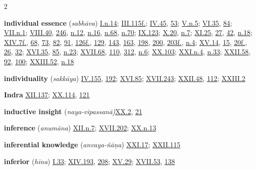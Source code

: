 \begin{multicols}{2}
\begin{vismHanging}
\par\textbf{individual essence} (\emph{sabhāva}) \hyperlink{I.n14}{I.n.14}{}; \hyperlink{III.115}{III.115f.}{}; \hyperlink{IV.45}{IV.45}{}, \hyperlink{IV.53}{53}{}; \hyperlink{V.n5}{V.n.5}{}; \hyperlink{VI.35}{VI.35}{}, \hyperlink{VI.84}{84}{}; \hyperlink{VII.n1}{VII.n.1}{}; \hyperlink{VIII.40}{VIII.40}{}, \hyperlink{VIII.246}{246}{}, \hyperlink{VIII.n12}{n.12}{}, \hyperlink{VIII.n16}{n.16}{}, \hyperlink{VIII.n68}{n.68}{}, \hyperlink{VIII.n70}{n.70}{}; \hyperlink{IX.123}{IX.123}{}; \hyperlink{X.20}{X.20}{}, \hyperlink{X.n7}{n.7}{}; \hyperlink{XI.25}{XI.25}{}, \hyperlink{XI.27}{27}{}, \hyperlink{XI.42}{42}{}, \hyperlink{XI.n18}{n.18}{}; \hyperlink{XIV.7}{XIV.7f.}{}, \hyperlink{XIV.68}{68}{}, \hyperlink{XIV.73}{73}{}, \hyperlink{XIV.82}{82}{}, \hyperlink{XIV.91}{91}{}, \hyperlink{XIV.126}{126f.}{}, \hyperlink{XIV.129}{129}{}, \hyperlink{XIV.143}{143}{}, \hyperlink{XIV.163}{163}{}, \hyperlink{XIV.198}{198}{}, \hyperlink{XIV.200}{200}{}, \hyperlink{XIV.203}{203f.}{}, \hyperlink{XIV.n4}{n.4}{}; \hyperlink{XV.14}{XV.14}{}, \hyperlink{XV.15}{15}{}, \hyperlink{XV.20}{20f.}{}, \hyperlink{XV.26}{26}{}, \hyperlink{XV.32}{32}{}; \hyperlink{XVI.35}{XVI.35}{}, \hyperlink{XVI.85}{85}{}, \hyperlink{XVI.n23}{n.23}{}; \hyperlink{XVII.68}{XVII.68}{}, \hyperlink{XVII.110}{110}{}, \hyperlink{XVII.312}{312}{}, \hyperlink{XVII.n6}{n.6}{}; \hyperlink{XX.103}{XX.103}{}; \hyperlink{XXI.n4}{XXI.n.4}{}, \hyperlink{XXI.n33}{n.33}{}; \hyperlink{XXII.58}{XXII.58}{}, \hyperlink{XXII.92}{92}{}, \hyperlink{XXII.100}{100}{}; \hyperlink{XXIII.52}{XXIII.52}{}, \hyperlink{XXIII.n18}{n.18}{}
\par\textbf{individuality} (\emph{sakkāya}) \hyperlink{IV.155}{IV.155}{}, \hyperlink{IV.192}{192}{}; \hyperlink{XVI.85}{XVI.85}{}; \hyperlink{XVII.243}{XVII.243}{}; \hyperlink{XXII.48}{XXII.48}{}, \hyperlink{XXII.112}{112}{}; \hyperlink{XXIII.2}{XXIII.2}{}
\par\textbf{Indra} \hyperlink{XII.137}{XII.137}{}; \hyperlink{XX.114}{XX.114}{}, \hyperlink{XX.121}{121}{}
\par\textbf{inductive insight} (\emph{naya-vipassanā)}\hyperlink{XX.2}{XX.2}{}, \hyperlink{XX.21}{21}{}
\par\textbf{inference} (\emph{anumāna}) \hyperlink{XII.n7}{XII.n.7}{}; \hyperlink{XVII.202}{XVII.202}{}; \hyperlink{XX.n13}{XX.n.13}{}
\par\textbf{inferential knowledge} (\emph{anvaya-ñāṇa}) \hyperlink{XXI.17}{XXI.17}{}; \hyperlink{XXII.115}{XXII.115}{}
\par\textbf{inferior} (\emph{hīna}) \hyperlink{I.33}{I.33}{}; \hyperlink{XIV.193}{XIV.193}{}, \hyperlink{XIV.208}{208}{}; \hyperlink{XV.29}{XV.29}{}; \hyperlink{XVII.53}{XVII.53}{}, \hyperlink{XVII.138}{138}{}

\end{vismHanging}
\end{multicols}
